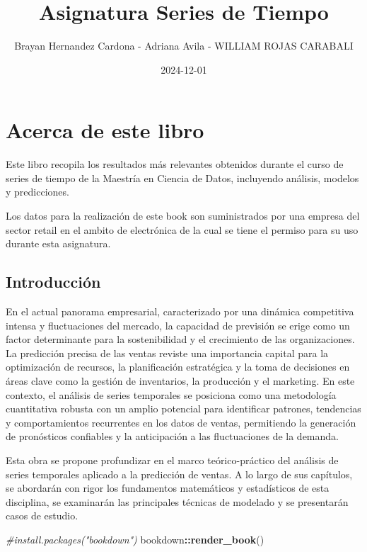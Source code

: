 \documentclass[
]{book}
\title{Asignatura Series de Tiempo}
\author{Brayan Hernandez Cardona - Adriana Avila - WILLIAM ROJAS CARABALI}
\date{2024-12-01}
\newenvironment{Shaded}{\begin{snugshade}}{\end{snugshade}}
\newcommand{\CommentTok}[1]{\textcolor[rgb]{0.56,0.35,0.01}{\textit{#1}}}
\newcommand{\FunctionTok}[1]{\textcolor[rgb]{0.13,0.29,0.53}{\textbf{#1}}}
\newcommand{\NormalTok}[1]{#1}
\newcommand{\SpecialCharTok}[1]{\textcolor[rgb]{0.81,0.36,0.00}{\textbf{#1}}}
\begin{document}
\maketitle

{
\setcounter{tocdepth}{1}
\tableofcontents
}
\chapter{Acerca de este libro}\label{acerca-de-este-libro}

Este libro recopila los resultados más relevantes obtenidos durante el curso de series de tiempo de la Maestría en Ciencia de Datos, incluyendo análisis, modelos y predicciones.

Los datos para la realización de este book son suministrados por una empresa del sector retail en el ambito de electrónica de la cual se tiene el permiso para su uso durante esta asignatura.

\section{Introducción}\label{introducciuxf3n}

En el actual panorama empresarial, caracterizado por una dinámica competitiva intensa y fluctuaciones del mercado, la capacidad de previsión se erige como un factor determinante para la sostenibilidad y el crecimiento de las organizaciones. La predicción precisa de las ventas reviste una importancia capital para la optimización de recursos, la planificación estratégica y la toma de decisiones en áreas clave como la gestión de inventarios, la producción y el marketing. En este contexto, el análisis de series temporales se posiciona como una metodología cuantitativa robusta con un amplio potencial para identificar patrones, tendencias y comportamientos recurrentes en los datos de ventas, permitiendo la generación de pronósticos confiables y la anticipación a las fluctuaciones de la demanda.

Esta obra se propone profundizar en el marco teórico-práctico del análisis de series temporales aplicado a la predicción de ventas. A lo largo de sus capítulos, se abordarán con rigor los fundamentos matemáticos y estadísticos de esta disciplina, se examinarán las principales técnicas de modelado y se presentarán casos de estudio.

\begin{Shaded}
\begin{Highlighting}[]
\CommentTok{\#install.packages("bookdown")}
\NormalTok{bookdown}\SpecialCharTok{::}\FunctionTok{render\_book}\NormalTok{()}
\end{Highlighting}
\end{Shaded}
\end{document}
